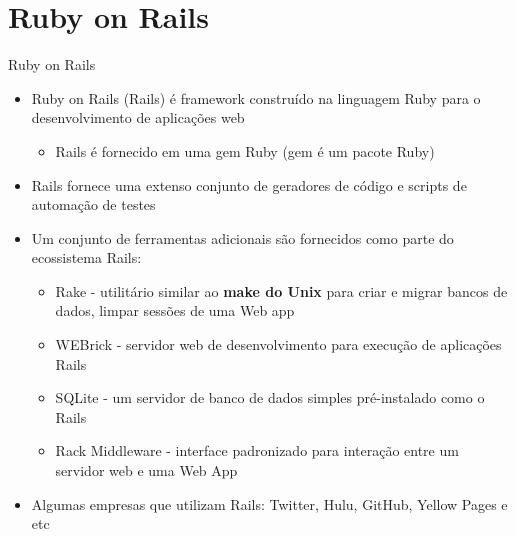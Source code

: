 \section{Ruby on Rails}

\begin{frame}{Ruby on Rails}
	\begin{itemize}
		\item Ruby on Rails (Rails) é framework construído na linguagem Ruby para o desenvolvimento de aplicações web
		\begin{itemize}
		  \item Rails é fornecido em uma \alert{gem} Ruby (gem é um pacote Ruby)
		\end{itemize}
		\item Rails fornece uma extenso conjunto de geradores de código e scripts de automação de testes
		\item Um conjunto de ferramentas adicionais são fornecidos como parte do ecossistema Rails:
		\begin{itemize}
			\item \alert{Rake} - utilitário similar ao \textbf{make do Unix} para criar e migrar bancos de dados, limpar sessões de uma Web app
			\item \alert{WEBrick} - servidor web de desenvolvimento para execução de aplicações Rails
			\item \alert{SQLite} - um servidor de banco de dados simples pré-instalado como o Rails
			\item \alert{Rack Middleware} - interface padronizado para interação entre um servidor web e uma Web App
		\end{itemize}
		\item Algumas empresas que utilizam Rails: Twitter, Hulu, GitHub, Yellow Pages e etc
	\end{itemize}
\end{frame}

